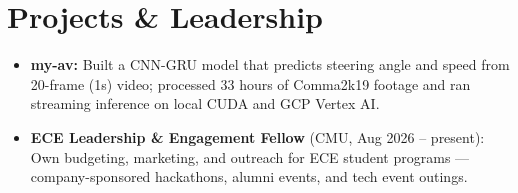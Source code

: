 \documentclass[11pt, letterpaper]{article}
\begin{document}
\section{Projects \& Leadership}
\begin{itemize}
  \item \textbf{my-av:} Built a CNN-GRU model that predicts steering angle and speed from 20-frame (1s) video; processed 33 hours of Comma2k19 footage and ran streaming inference on local CUDA and GCP Vertex AI.
  \item \textbf{ECE Leadership \& Engagement Fellow} (CMU, Aug 2026 -- present): Own budgeting, marketing, and outreach for ECE student programs --- company-sponsored hackathons, alumni events, and tech event outings.
\end{itemize}
\end{document}
